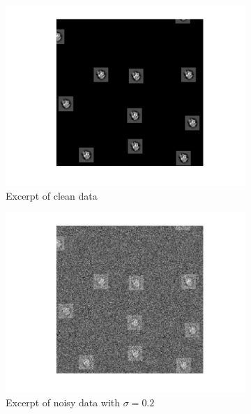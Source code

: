 \documentclass[english,11pt]{article}
\numberwithin{equation}{section}
\theoremstyle{plain}
\theoremstyle{definition}
\theoremstyle{remark}
\theoremstyle{plain}
\theoremstyle{remark}
\theoremstyle{plain}
\theoremstyle{plain}
\begin{document}
\begin{figure}[ht!]
    \advance\leftskip-4cm
   \advance\rightskip-4cm


	\begin{subfigure}{.5\textwidth}
		\centering
	\includegraphics[scale=0.5]{data2D_clean}
\caption{Excerpt of clean data}
\label{fig:data2D_clean}
	\end{subfigure}%
	\begin{subfigure}{.5\textwidth}
	\centering
\includegraphics[scale=0.5]{data2D_noisy_02}
\caption{Excerpt of noisy data with $\sigma=0.2$}
\label{fig:data2D_noisy_02}
	\end{subfigure}
	\begin{subfigure}{.5\textwidth}

\end{subfigure}
\end{figure}
\end{document}
